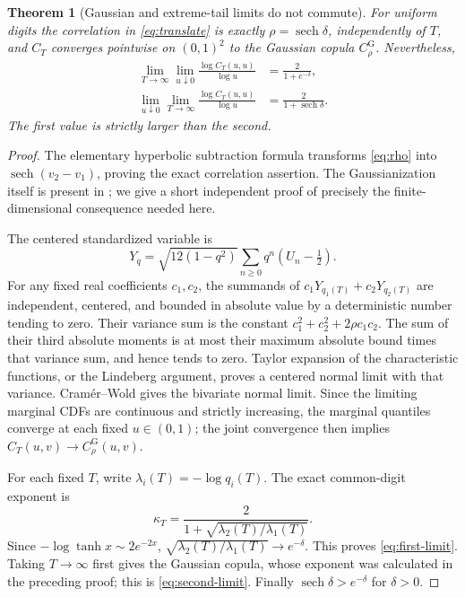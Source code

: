 \documentclass[11pt,a4paper]{article}
\newtheorem{theorem}{Theorem}[section]
\theoremstyle{definition}
\theoremstyle{remark}
\newcommand{\sech}{\operatorname{sech}}
\numberwithin{equation}{section}
\begin{document}
\begin{theorem}[Gaussian and extreme-tail limits do not commute]
\label{thm:noncommute}
For uniform digits the correlation in \eqref{eq:translate} is exactly
$\rho=\sech\delta$, independently of $T$, and $C_T$ converges pointwise
on $(0,1)^2$ to the Gaussian copula $C_\rho^{\mathrm G}$. Nevertheless,
\begin{align}
 \lim_{T\to\infty}\lim_{u\downarrow0}
 \frac{\log C_T(u,u)}{\log u}
 &=\frac2{1+e^{-\delta}},\label{eq:first-limit}\\
 \lim_{u\downarrow0}\lim_{T\to\infty}
 \frac{\log C_T(u,u)}{\log u}
 &=\frac2{1+\sech\delta}.
 \label{eq:second-limit}
\end{align}
The first value is strictly larger than the second.
\end{theorem}
\begin{proof}
The elementary hyperbolic subtraction formula transforms \eqref{eq:rho}
into $\sech(v_2-v_1)$, proving the exact correlation assertion.
The Gaussianization itself is present in \cite{RepoCommon}; we give a
short independent proof of precisely the finite-dimensional consequence
needed here.

The centered standardized variable is
\[
 Y_q=\sqrt{12(1-q^2)}\sum_{n\ge0}q^n(U_n-\tfrac12).
\]
For any fixed real coefficients $c_1,c_2$, the summands of
$c_1Y_{q_1(T)}+c_2Y_{q_2(T)}$ are independent, centered, and bounded in
absolute value by a deterministic number tending to zero. Their variance
sum is the constant
$c_1^2+c_2^2+2\rho c_1c_2$. The sum of their third absolute moments is
at most their maximum absolute bound times that variance sum, and hence
tends to zero. Taylor expansion of the characteristic functions, or the
Lindeberg argument, proves a centered normal limit with that variance.
Cram\'er--Wold gives the bivariate normal limit. Since the limiting
marginal CDFs are continuous and strictly increasing, the marginal
quantiles converge at each fixed $u\in(0,1)$; the joint convergence then
implies $C_T(u,v)\to C_\rho^{\mathrm G}(u,v)$.

For each fixed $T$, write $\lambda_i(T)=-\log q_i(T)$. The exact
common-digit exponent is
\[
 \kappa_T=\frac2{1+\sqrt{\lambda_2(T)/\lambda_1(T)}}.
\]
Since $-\log\tanh x\sim2e^{-2x}$,
$\sqrt{\lambda_2(T)/\lambda_1(T)}\to e^{-\delta}$.
This proves \eqref{eq:first-limit}. Taking $T\to\infty$ first gives
the Gaussian copula, whose exponent was calculated in the preceding
proof; this is \eqref{eq:second-limit}. Finally
$\sech\delta>e^{-\delta}$ for $\delta>0$.
\end{proof}
\end{document}
